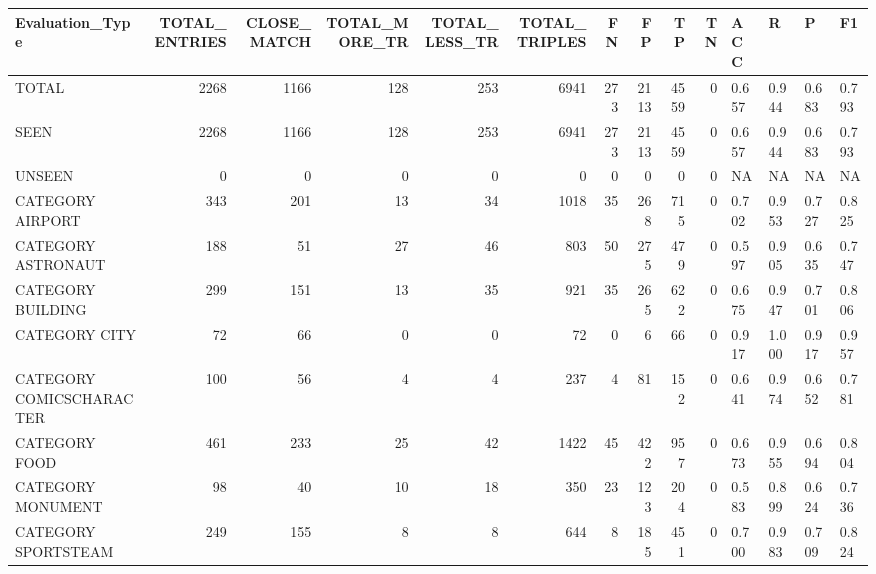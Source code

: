 \begin{tabular}{lrrrrrrrrrllll}
\hline
 Evaluation\_Type          &   TOTAL\_ENTRIES &   CLOSE\_MATCH &   TOTAL\_MORE\_TR &   TOTAL\_LESS\_TR &   TOTAL\_TRIPLES &   FN &   FP &   TP &   TN & ACC   & R     & P     & F1    \\
\hline
 TOTAL                    &            2268 &          1166 &             128 &             253 &            6941 &  273 & 2113 & 4559 &    0 & 0.657 & 0.944 & 0.683 & 0.793 \\
 SEEN                     &            2268 &          1166 &             128 &             253 &            6941 &  273 & 2113 & 4559 &    0 & 0.657 & 0.944 & 0.683 & 0.793 \\
 UNSEEN                   &               0 &             0 &               0 &               0 &               0 &    0 &    0 &    0 &    0 & NA    & NA    & NA    & NA    \\
 CATEGORY AIRPORT         &             343 &           201 &              13 &              34 &            1018 &   35 &  268 &  715 &    0 & 0.702 & 0.953 & 0.727 & 0.825 \\
 CATEGORY ASTRONAUT       &             188 &            51 &              27 &              46 &             803 &   50 &  275 &  479 &    0 & 0.597 & 0.905 & 0.635 & 0.747 \\
 CATEGORY BUILDING        &             299 &           151 &              13 &              35 &             921 &   35 &  265 &  622 &    0 & 0.675 & 0.947 & 0.701 & 0.806 \\
 CATEGORY CITY            &              72 &            66 &               0 &               0 &              72 &    0 &    6 &   66 &    0 & 0.917 & 1.000 & 0.917 & 0.957 \\
 CATEGORY COMICSCHARACTER &             100 &            56 &               4 &               4 &             237 &    4 &   81 &  152 &    0 & 0.641 & 0.974 & 0.652 & 0.781 \\
 CATEGORY FOOD            &             461 &           233 &              25 &              42 &            1422 &   45 &  422 &  957 &    0 & 0.673 & 0.955 & 0.694 & 0.804 \\
 CATEGORY MONUMENT        &              98 &            40 &              10 &              18 &             350 &   23 &  123 &  204 &    0 & 0.583 & 0.899 & 0.624 & 0.736 \\
 CATEGORY SPORTSTEAM      &             249 &           155 &               8 &               8 &             644 &    8 &  185 &  451 &    0 & 0.700 & 0.983 & 0.709 & 0.824 \\

\end{tabular}
